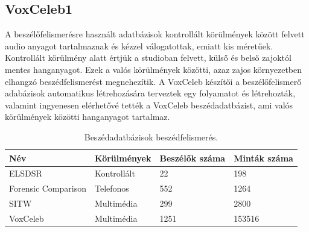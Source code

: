 \subsection{VoxCeleb1}

A beszélőfelismerésre használt adatbázisok kontrollált körülmények között felvett audio anyagot tartalmaznak és kézzel válogatottak, emiatt kis méretűek. Kontrollált körülmény alatt értjük a studioban felvett, külső és belső zajoktól mentes hanganyagot. Ezek a valós körülmények közötti, azaz zajos környezetben elhangzó beszédfelismerést megnehezítik. A VoxCeleb készítői a beszélőfelismerő adabázisok automatikus létrehozására terveztek egy folyamatot és létrehozták, valamint ingyenesen elérhetővé tették a VoxCeleb beszédadatbázist, ami valós körülmények közötti hanganyagot tartalmaz.
\newline
\newline

\begin{table}[!ht]
	\begin{tabular}{*4l} \toprule
		\bfseries Név & \bfseries Körülmények & \bfseries Beszélők száma & \bfseries Minták száma \\ \midrule
		ELSDSR                             & Kontrollált & 22     & 198          \\
		\rowcolor{gray!10} 
		Forensic Comparison                & Telefonos   & 552   & 1264        \\
		SITW                           & Multimédia        & 299   & 2800        \\
		\rowcolor{gray!10} 
		VoxCeleb                           & Multimédia        & 1251   & 153516        \\
		\bottomrule
		\hline
	\end{tabular}
	\centering
	\caption{Beszédadatbázisok beszédfelismerés.}
	\label{fig:speaker-recognition-datasets}
\end{table}

